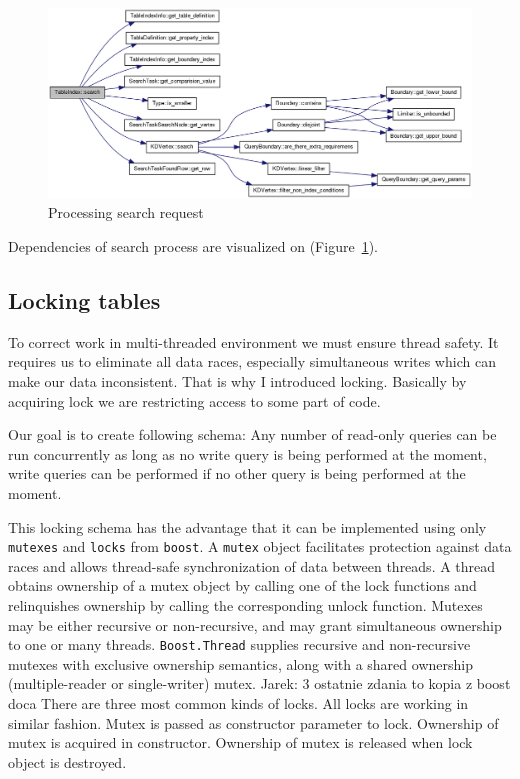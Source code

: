 \documentclass[10pt,a4paper]{article}
\newcommand{\jarek}[1]{\noindent\colorbox{myYellow}{Jarek: #1}}
\begin{document}
\begin{figure}
\centering
  \includegraphics[width=16cm]{search}
  \caption{Processing search request}
  \label{fig:search}
\end{figure}

Dependencies of search process are visualized on (Figure~\ref{fig:search}).

\subsection{Locking tables}

To correct work in multi-threaded environment we must ensure thread safety. It requires us to eliminate all data races, especially simultaneous writes which can make our data inconsistent. That is why I introduced locking. Basically by acquiring lock we are restricting access to some part of code. 

Our goal is to create following schema: Any number of read-only queries can be run concurrently as long as no write query is being performed at the moment, write queries can be performed if no other query is being performed at the moment. 

This locking schema has the advantage that it can be implemented using only \verb|mutexes| and \verb|locks| from \verb|boost|. A \verb|mutex| object facilitates protection against data races and allows thread-safe synchronization of data between threads. A thread obtains ownership of a mutex object by calling one of the lock functions and relinquishes ownership by calling the corresponding unlock function. Mutexes may be either recursive or non-recursive, and may grant simultaneous ownership to one or many threads. \verb|Boost.Thread| supplies recursive and non-recursive mutexes with exclusive ownership semantics, along with a shared ownership (multiple-reader or single-writer) mutex. \jarek{3 ostatnie zdania to kopia z boost doca}
There are three most common kinds of locks. All locks are working in similar fashion. Mutex is passed as constructor parameter to lock. Ownership of mutex is acquired in constructor. Ownership of mutex is released when lock object is destroyed.  
\end{document}
